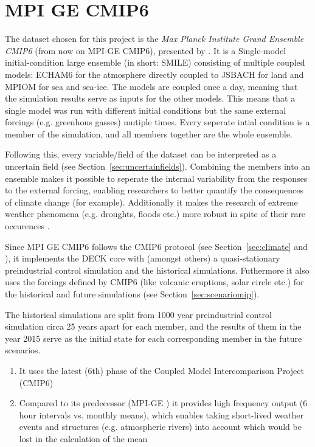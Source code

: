 \chapter{MPI GE CMIP6}
\label{ch:dataset}

The dataset chosen for this project is the \textit{Max Planck Institute Grand Ensemble CMIP6} (from now on MPI-GE CMIP6), presented by \citeauthor{olonscheck_new_2023}. 
It is a Single-model initial-condition large ensemble (in short: SMILE) consisting of multiple coupled models: ECHAM6 for the atmosphere directly coupled to JSBACH for land and MPIOM for sea and sea-ice. 
The models are coupled once a day, meaning that the simulation results serve as inputs for the other models. 
This means that a single model was run with different initial conditions but the same external forcings (e.g. greenhous gasses) mutiple times. 
Every seperate intial condition is a member of the simulation, and all members together are the whole ensemble. \cite{olonscheck_new_2023}

Following this, every variable/field of the dataset can be interpreted as a uncertain field (see Section~\ref{sec:uncertainfields}).
Combining the members into an ensemble makes it possible to seperate the internal variability from the responses to the external forcing, enabling researchers to better quantify the consequences of climate change (for example). 
Additionally it makes the research of extreme weather phenomena (e.g. droughts, floods etc.) more robust in spite of their rare occurences \cite{maher_large_2021}. 


Since MPI GE CMIP6 follows the CMIP6 protocol (see Section~\ref{sec:climate} and \cite{eyring_overview_2016}), it implements the DECK core with (amongst others) a quasi-stationary preindustrial control simulation and the historical simulations.
Futhermore it also uses the forcings defined by CMIP6 (like volcanic eruptions, solar circle etc.) for the historical and future simulations (see Section~\ref{sec:scenariomip}).

The historical simulations are split from 1000 year preindustrial control simulation circa 25 years apart for each member, and the results of them in the year 2015 serve as the initial state for each corresponding member in the future scenarios. 

\begin{enumerate}[itemsep=1pt, topsep=2pt]
  \item It uses the latest (6th) phase of the Coupled Model Intercomparison Project (CMIP6)
  \item Compared to its predecessor (MPI-GE \cite{maher_max_2019}) it provides high frequency output (6 hour intervals vs. monthly means), which enables taking short-lived weather events and structures (e.g. atmospheric rivers) into account which would be lost in the calculation of the mean
\end{enumerate}


